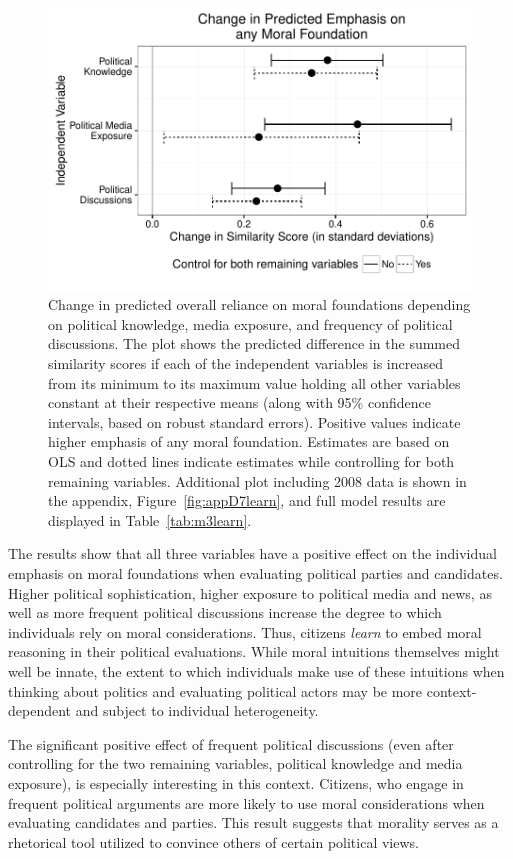 \documentclass[12pt]{article}
\begin{document}
\begin{figure}[h]\centering
\includegraphics[scale=.9]{../calc/fig/fig3learn.pdf}
\caption{Change in predicted overall reliance on moral foundations depending on political knowledge, media exposure, and frequency of political discussions. The plot shows the predicted difference in the summed similarity scores if each of the independent variables is increased from its minimum to its maximum value holding all other variables constant at their respective means (along with 95\% confidence intervals, based on robust standard errors). Positive values indicate higher emphasis of any moral foundation. Estimates are based on OLS and dotted lines indicate estimates while controlling for both remaining variables. Additional plot including 2008 data is shown in the appendix, Figure~\ref{fig:appD7learn}, and full model results are displayed in Table~\ref{tab:m3learn}.}\label{fig:3learn}
\end{figure}

The results show that all three variables have a positive effect on the individual emphasis on moral foundations when evaluating political parties and candidates. Higher political sophistication, higher exposure to political media and news, as well as more frequent political discussions increase the degree to which individuals rely on moral considerations. Thus, citizens \textit{learn} to embed moral reasoning in their political evaluations. While moral intuitions themselves might well be innate, the extent to which individuals make use of these intuitions when thinking about politics and evaluating political actors may be more context-dependent and subject to individual heterogeneity.

The significant positive effect of frequent political discussions (even after controlling for the two remaining variables, political knowledge and media exposure), is especially interesting in this context. Citizens, who engage in frequent political arguments are more likely to use moral considerations when evaluating candidates and parties. This result suggests that morality serves as a rhetorical tool utilized to convince others of certain political views.
\end{document}
